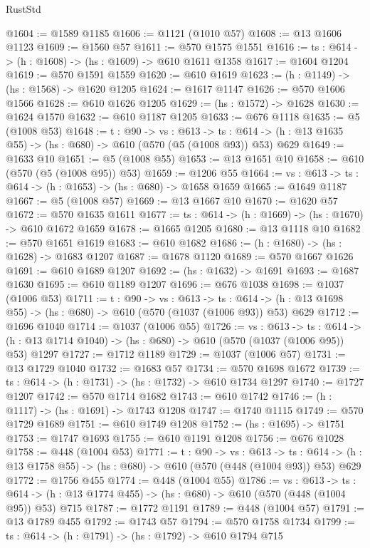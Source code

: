 \begin{lexlean}{RustStd}
\begin{coremodule}
@1604 := @1589 @1185
@1606 := @1121 (@1010 @57)
@1608 := @13 @1606 @1123
@1609 := @1560 @57
@1611 := @570 @1575 @1551
@1616 := {ts : @614} -> (h : @1608) -> (hs : @1609) -> @610 @1611 @1358
@1617 := @1604 @1204
@1619 := @570 @1591 @1559
@1620 := @610 @1619
@1623 := (h : @1149) -> (hs : @1568) -> @1620 @1205
@1624 := @1617 @1147
@1626 := @570 @1606 @1566
@1628 := @610 @1626 @1205
@1629 := (hs : @1572) -> @1628
@1630 := @1624 @1570
@1632 := @610 @1187 @1205
@1633 := @676 @1118
@1635 := @5 (@1008 @53)
@1648 := {t : @90} ->
  {vs : @613} ->
  {ts : @614} -> (h : @13 @1635 @55) -> (hs : @680) -> @610 (@570 (@5 (@1008 @93)) @53) @629
@1649 := @1633 @10
@1651 := @5 (@1008 @55)
@1653 := @13 @1651 @10
@1658 := @610 (@570 (@5 (@1008 @95)) @53)
@1659 := @1206 @55
@1664 := {vs : @613} -> {ts : @614} -> (h : @1653) -> (hs : @680) -> @1658 @1659
@1665 := @1649 @1187
@1667 := @5 (@1008 @57)
@1669 := @13 @1667 @10
@1670 := @1620 @57
@1672 := @570 @1635 @1611
@1677 := {ts : @614} -> (h : @1669) -> (hs : @1670) -> @610 @1672 @1659
@1678 := @1665 @1205
@1680 := @13 @1118 @10
@1682 := @570 @1651 @1619
@1683 := @610 @1682
@1686 := (h : @1680) -> (hs : @1628) -> @1683 @1207
@1687 := @1678 @1120
@1689 := @570 @1667 @1626
@1691 := @610 @1689 @1207
@1692 := (hs : @1632) -> @1691
@1693 := @1687 @1630
@1695 := @610 @1189 @1207
@1696 := @676 @1038
@1698 := @1037 (@1006 @53)
@1711 := {t : @90} ->
  {vs : @613} ->
  {ts : @614} -> (h : @13 @1698 @55) -> (hs : @680) -> @610 (@570 (@1037 (@1006 @93)) @53) @629
@1712 := @1696 @1040
@1714 := @1037 (@1006 @55)
@1726 := {vs : @613} ->
  {ts : @614} -> (h : @13 @1714 @1040) -> (hs : @680) -> @610 (@570 (@1037 (@1006 @95)) @53) @1297
@1727 := @1712 @1189
@1729 := @1037 (@1006 @57)
@1731 := @13 @1729 @1040
@1732 := @1683 @57
@1734 := @570 @1698 @1672
@1739 := {ts : @614} -> (h : @1731) -> (hs : @1732) -> @610 @1734 @1297
@1740 := @1727 @1207
@1742 := @570 @1714 @1682
@1743 := @610 @1742
@1746 := (h : @1117) -> (hs : @1691) -> @1743 @1208
@1747 := @1740 @1115
@1749 := @570 @1729 @1689
@1751 := @610 @1749 @1208
@1752 := (hs : @1695) -> @1751
@1753 := @1747 @1693
@1755 := @610 @1191 @1208
@1756 := @676 @1028
@1758 := @448 (@1004 @53)
@1771 := {t : @90} ->
  {vs : @613} ->
  {ts : @614} -> (h : @13 @1758 @55) -> (hs : @680) -> @610 (@570 (@448 (@1004 @93)) @53) @629
@1772 := @1756 @455
@1774 := @448 (@1004 @55)
@1786 := {vs : @613} ->
  {ts : @614} -> (h : @13 @1774 @455) -> (hs : @680) -> @610 (@570 (@448 (@1004 @95)) @53) @715
@1787 := @1772 @1191
@1789 := @448 (@1004 @57)
@1791 := @13 @1789 @455
@1792 := @1743 @57
@1794 := @570 @1758 @1734
@1799 := {ts : @614} -> (h : @1791) -> (hs : @1792) -> @610 @1794 @715

\end{coremodule}
\end{lexlean}
